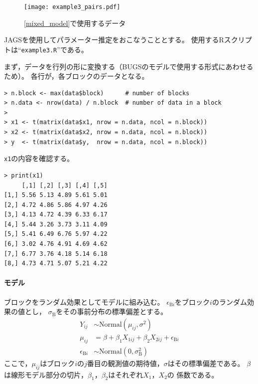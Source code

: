 \documentclass[11pt,uplatex]{jsarticle}
\begin{document}
\begin{figure}[htbp]
	\begin{center}
		\texttt{[image: example3\_pairs.pdf]}
	\end{center}
	\caption{\ref{mixed_model}で使用するデータ}
	\label{example3_pairs_plot}
\end{figure}

\textsf{JAGS}を使用してパラメーター推定をおこなうこととする。
使用する\textsf{R}スクリプトは``\texttt{example3.R}''である。

まず，データを行列の形に変換する（BUGSのモデルで使用する形式にあわせるため）。
各行が，各ブロックのデータとなる。

\begin{lstlisting}
> n.block <- max(data$block)      # number of blocks
> n.data <- nrow(data) / n.block  # number of data in a block
>
> x1 <- t(matrix(data$x1, nrow = n.data, ncol = n.block))
> x2 <- t(matrix(data$x2, nrow = n.data, ncol = n.block))
> y  <- t(matrix(data$y,  nrow = n.data, ncol = n.block))
\end{lstlisting}

\vspace{4zw}


\texttt{x1}の内容を確認する。
\begin{lstlisting}
> print(x1)
     [,1] [,2] [,3] [,4] [,5]
[1,] 5.56 5.13 4.89 5.61 5.01
[2,] 4.72 4.86 5.86 4.97 4.26
[3,] 4.13 4.72 4.39 6.33 6.17
[4,] 5.44 3.26 3.73 3.11 4.09
[5,] 5.41 6.49 6.76 5.97 4.22
[6,] 3.02 4.76 4.91 4.69 4.62
[7,] 6.77 3.76 4.18 5.14 6.18
[8,] 4.73 4.71 5.07 5.21 4.22
\end{lstlisting}

\paragraph{モデル}
ブロックをランダム効果としてモデルに組み込む。
$\epsilon_{\mathrm{B}i}$をブロック$i$のランダム効果の値とし，
$\sigma_\mathrm{B}$をその事前分布の標準偏差とする。
\begin{align*}
Y_{ij} &\sim \mathrm{Normal}(\mu_{ij}, \sigma^{2}) \\
\mu_{ij} &= \beta + \beta_{1} X_{1ij} + \beta_{2} X_{2ij} + \epsilon_{\mathrm{B}i} \\
\epsilon_{\mathrm{B}i} &\sim \mathrm{Normal}(0, \sigma_\mathrm{B}^{2})
\end{align*}
\noindent
ここで，$\mu_{ij}$はブロック$i$の$j$番目の観測値の期待値，$\sigma$はその標準偏差である。
$\beta$は線形モデル部分の切片，$\beta_{1}$，$\beta_{2}$はそれぞれ$X_{1}$，$X_{2}$の
係数である。
\end{document}
